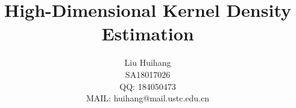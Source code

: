 \title{%
High-Dimensional Kernel Density Estimation
}

\author{\name Liu Huihang  \\
        \addr SA18017026 \\
        QQ: 184050473 \\ 
        MAIL: huihang@mail.ustc.edu.cn
       }

\editor{}

\maketitle